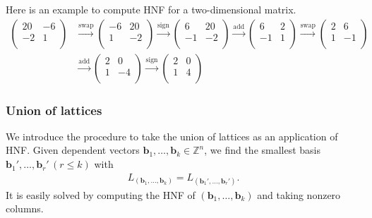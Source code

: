 Here is an example to compute HNF for a two-dimensional matrix.
\begin{align*}
  \begin{pmatrix}
    20 & -6 \\
    -2 & 1 \\
  \end{pmatrix}
  &\overset{\mbox{swap}}{\longrightarrow}
  \begin{pmatrix}
    -6 & 20 \\
    1 & -2 \\
  \end{pmatrix}
  \overset{\mbox{sign}}{\longrightarrow}
  \begin{pmatrix}
    6 & 20 \\
    -1 & -2 \\
  \end{pmatrix}
  \overset{\mbox{add}}{\longrightarrow}
  \begin{pmatrix}
    6 & 2 \\
    -1 & 1 \\
  \end{pmatrix}
  \overset{\mbox{swap}}{\longrightarrow}
  \begin{pmatrix}
    2 & 6 \\
    1 & -1 \\
  \end{pmatrix} \\
  &\overset{\mbox{add}}{\longrightarrow}
  \begin{pmatrix}
    2 & 0 \\
    1 & -4 \\
  \end{pmatrix}
  \overset{\mbox{sign}}{\longrightarrow}
  \begin{pmatrix}
    2 & 0 \\
    1 & 4 \\
  \end{pmatrix}
\end{align*}

\subsubsection{Union of lattices}

We introduce the procedure to take the union of lattices as an application of HNF.
Given dependent vectors $\bm{b}_{1}, \dots, \bm{b}_{k} \in \mathbb{Z}^{n}$, we find the smallest basis $\bm{b}_{1}', \dots, \bm{b}_{r}' \, (r \leq k)$ with
\begin{align*}
  L_{\left( \bm{b}_{1}, \dots, \bm{b}_{k} \right)} = L_{ \left( \bm{b}_{1}', \dots, \bm{b}_{r}' \right) }.
\end{align*}
It is easily solved by computing the HNF of $\left( \bm{b}_{1}, \dots, \bm{b}_{k} \right)$ and taking nonzero columns.

